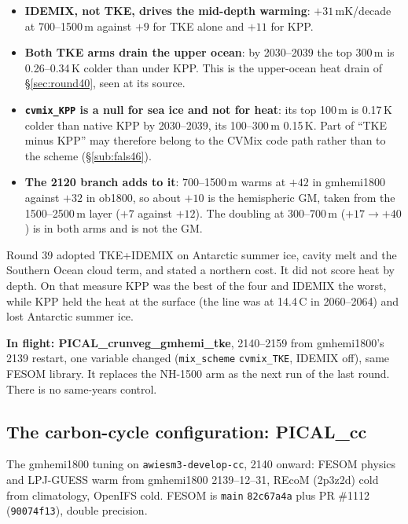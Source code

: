\documentclass[10pt]{article}
\begin{document}
\begin{itemize}\itemsep1pt
\item \textbf{IDEMIX, not TKE, drives the mid-depth warming}: $+31$\,mK/decade at 700--1500\,m
      against $+9$ for TKE alone and $+11$ for KPP.
\item \textbf{Both TKE arms drain the upper ocean}: by 2030--2039 the top 300\,m is 0.26--0.34\,K
      colder than under KPP. This is the upper-ocean heat drain of \S\ref{sec:round40}, seen at its
      source.
\item \textbf{\texttt{cvmix\_KPP} is a null for sea ice and not for heat}: its top 100\,m is
      0.17\,K colder than native KPP by 2030--2039, its 100--300\,m 0.15\,K. Part of ``TKE minus
      KPP'' may therefore belong to the CVMix code path rather than to the scheme
      (\S\ref{sub:fals46}).
\item \textbf{The 2120 branch adds to it}: 700--1500\,m warms at $+42$ in gmhemi1800 against $+32$
      in ob1800, so about $+10$ is the hemispheric GM, taken from the 1500--2500\,m layer ($+7$
      against $+12$). The doubling at 300--700\,m ($+17\to{+40}$) is in both arms and is not the GM.
\end{itemize}

Round 39 adopted TKE+IDEMIX on Antarctic summer ice, cavity melt and the Southern Ocean cloud term,
and stated a northern cost. It did not score heat by depth. On that measure KPP was the best of the
four and IDEMIX the worst, while KPP held the heat at the surface (the line was at 14.4\,\textdegree C in
2060--2064) and lost Antarctic summer ice.

\textbf{In flight: PICAL\_crunveg\_gmhemi\_tke}, 2140--2159 from gmhemi1800's 2139 restart, one
variable changed (\texttt{mix\_scheme} \texttt{cvmix\_TKE}, IDEMIX off), same FESOM library. It
replaces the NH-1500 arm as the next run of the last round. There is no same-years control.

\subsection{The carbon-cycle configuration: PICAL\_cc}\label{sub:r46cc}

The gmhemi1800 tuning on \texttt{awiesm3-develop-cc}, 2140 onward: FESOM physics and LPJ-GUESS warm
from gmhemi1800 2139--12--31, REcoM (2p3z2d) cold from climatology, OpenIFS cold. FESOM is
\texttt{main} \texttt{82c67a4a} plus PR \#1112 (\texttt{90074f13}), double precision.
\end{document}
